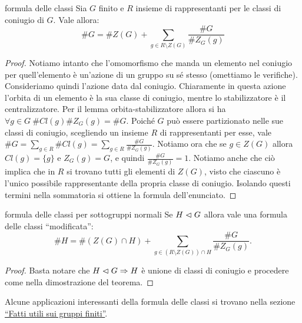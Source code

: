\begin{theorem}{formula delle classi}
    Sia $G$ finito e $R$ insieme di rappresentanti per le classi di coniugio di $G$. Vale allora:
    \[
    \#G = \#Z(G) + \sum_{g \in R \setminus Z(G)} \frac{\#G}{\#Z_G(g)}
    \]
\end{theorem}
\begin{proof}
    Notiamo intanto che l'omomorfismo che manda un elemento nel coniugio per quell'elemento è un'azione di un gruppo su sé stesso (omettiamo le verifiche). Consideriamo quindi l'azione data dal coniugio. Chiaramente in questa azione l'orbita di un elemento è la sua classe di coniugio, mentre lo stabilizzatore è il centralizzatore. Per il lemma orbita-stabilizzatore allora si ha $\forall g \in G \ \#Cl(g)\#Z_G(g) = \#G$.  Poiché $G$ può essere partizionato nelle sue classi di coniugio, scegliendo un insieme $R$ di rappresentanti per esse, vale $\#G = \sum_{g \in R} \#Cl(g) = \sum_{g \in R} \frac{\#G}{\#Z_G(g)}$. Notiamo ora che se $g \in Z(G)$ allora $Cl(g) = \{g\}$ e $Z_G(g) = G$, e quindi $\frac{\#G}{\#Z_G(g)} = 1$. Notiamo anche che ciò implica che in $R$ si trovano tutti gli elementi di $Z(G)$, visto che ciascuno è l'unico possibile rappresentante della propria classe di coniugio. Isolando questi termini nella sommatoria si ottiene la formula dell'enunciato.
\end{proof}
\begin{corollary}{formula delle classi per sottogruppi normali}
    Se $H \vartriangleleft G$ allora vale una formula delle classi ``modificata'':
    \[
    \#H = \#(Z(G)\cap H) + \sum_{g \in (R \setminus Z(G)) \cap H} \frac{\#G}{\#Z_G(g)}.
    \]
\end{corollary}
\begin{proof}
    Basta notare che $H \vartriangleleft G \Rightarrow H$ è unione di classi di coniugio e procedere come nella dimostrazione del teorema.
\end{proof}
Alcune applicazioni interessanti della formula delle classi si trovano nella sezione \hyperlink{gruppi finiti}{``Fatti utili sui gruppi finiti''}.

